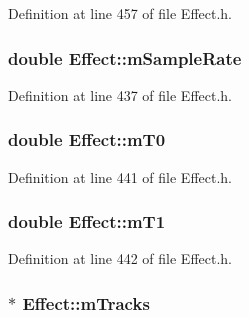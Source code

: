 Definition at line 457 of file Effect.\+h.

\subsubsection[{\texorpdfstring{m\+Sample\+Rate}{mSampleRate}}]{\setlength{\rightskip}{0pt plus 5cm}double Effect\+::m\+Sample\+Rate\hspace{0.3cm}{\ttfamily [protected]}}\hypertarget{class_effect_ab1a3d8e761e17f8dbe1a9ad749de4327}{}\label{class_effect_ab1a3d8e761e17f8dbe1a9ad749de4327}


Definition at line 437 of file Effect.\+h.

\subsubsection[{\texorpdfstring{m\+T0}{mT0}}]{\setlength{\rightskip}{0pt plus 5cm}double Effect\+::m\+T0\hspace{0.3cm}{\ttfamily [protected]}}\hypertarget{class_effect_ae83563966df5c0b3aba90dd183b15b53}{}\label{class_effect_ae83563966df5c0b3aba90dd183b15b53}


Definition at line 441 of file Effect.\+h.

\subsubsection[{\texorpdfstring{m\+T1}{mT1}}]{\setlength{\rightskip}{0pt plus 5cm}double Effect\+::m\+T1\hspace{0.3cm}{\ttfamily [protected]}}\hypertarget{class_effect_a7681f0ae7a8245659b002078e78ef146}{}\label{class_effect_a7681f0ae7a8245659b002078e78ef146}


Definition at line 442 of file Effect.\+h.

\subsubsection[{\texorpdfstring{m\+Tracks}{mTracks}}]{$\ast$ Effect\+::m\+Tracks\hspace{0.3cm}{\ttfamily [protected]}}\hypertarget{class_effect_a5617560453677f895be8d2d7b5d7e19d}{}\label{class_effect_a5617560453677f895be8d2d7b5d7e19d}


